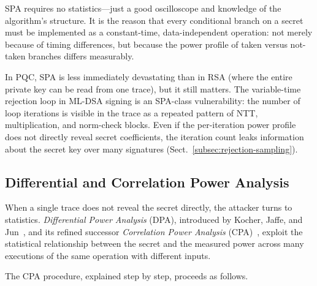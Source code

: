 SPA requires no statistics---just a good oscilloscope and knowledge of the algorithm's structure.  It is the reason that every conditional branch on a secret must be implemented as a constant-time, data-independent operation: not merely because of timing differences, but because the power profile of taken versus not-taken branches differs measurably.

In PQC, SPA is less immediately devastating than in RSA (where the entire private key can be read from one trace), but it still matters.  The variable-time rejection loop in ML-DSA signing is an SPA-class vulnerability: the number of loop iterations is visible in the trace as a repeated pattern of NTT, multiplication, and norm-check blocks.  Even if the per-iteration power profile does not directly reveal secret coefficients, the iteration count leaks information about the secret key over many signatures (Sect.~\ref{subsec:rejection-sampling}).


\subsection{Differential and Correlation Power Analysis}
\label{subsec:dpa-cpa}

When a single trace does not reveal the secret directly, the attacker turns to statistics.  \emph{Differential Power Analysis} (DPA), introduced by Kocher, Jaffe, and Jun~\cite{KocherJaffeJun1999}, and its refined successor \emph{Correlation Power Analysis} (CPA)~\cite{BrierClavier2004}, exploit the statistical relationship between the secret and the measured power across many executions of the same operation with different inputs.

The CPA procedure, explained step by step, proceeds as follows.

